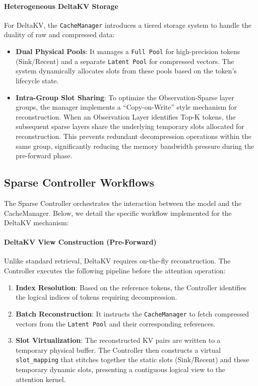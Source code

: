 \paragraph{Heterogeneous DeltaKV Storage} 
For DeltaKV, the \texttt{CacheManager} introduces a tiered storage system to handle the duality of raw and compressed data:
\begin{itemize}[nolistsep, left=0pt]
  \item \textbf{Dual Physical Pools}: It manages a \texttt{Full Pool} for high-precision tokens (Sink/Recent) and a separate \texttt{Latent Pool} for compressed vectors. The system dynamically allocates slots from these pools based on the token's lifecycle state.
  
  \item \textbf{Intra-Group Slot Sharing}: To optimize the Observation-Sparse layer groups, the manager implements a ``Copy-on-Write'' style mechanism for reconstruction. When an Observation Layer identifies Top-K tokens, the subsequent sparse layers share the underlying temporary slots allocated for reconstruction. This prevents redundant decompression operations within the same group, significantly reducing the memory bandwidth pressure during the pre-forward phase.
\end{itemize}



\subsection{Sparse Controller Workflows}
\label{app:sparse_vllm:workflows}

The Sparse Controller orchestrates the interaction between the model and the CacheManager. 
Below, we detail the specific workflow implemented for the DeltaKV mechanism:

\paragraph{DeltaKV View Construction (Pre-Forward)}
Unlike standard retrieval, DeltaKV requires on-the-fly reconstruction. The Controller executes the following pipeline before the attention operation:
\begin{enumerate}[nolistsep,label*=(\arabic*)]
  \item \textbf{Index Resolution}: Based on the reference tokens, the Controller identifies the logical indices of tokens requiring decompression.
  
  \item \textbf{Batch Reconstruction}: It instructs the \texttt{CacheManager} to fetch compressed vectors from the \texttt{Latent Pool} and their corresponding references.
  
  \item \textbf{Slot Virtualization}: The reconstructed KV pairs are written to a temporary physical buffer. The Controller then constructs a virtual \texttt{slot\_mapping} that stitches together the static slots (Sink/Recent) and these temporary dynamic slots, presenting a contiguous logical view to the attention kernel.
\end{enumerate}

